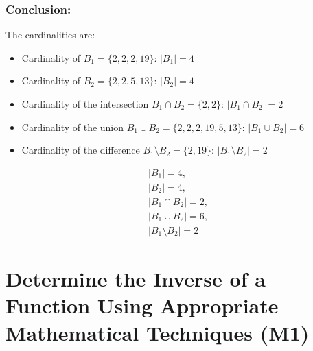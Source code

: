 \documentclass[12pt, a4paper, twoside]{report} %
\begin{document}
\subsubsection*{Conclusion:}
The cardinalities are:
\begin{itemize}
  \item Cardinality of \( B_1 = \{2, 2, 2, 19\} \): \( |B_1| = 4 \)
  \item Cardinality of \( B_2 = \{2, 2, 5, 13\} \): \( |B_2| = 4 \)
  \item Cardinality of the intersection \( B_1 \cap B_2 = \{2, 2\} \): \( |B_1 \cap B_2| = 2 \)
  \item Cardinality of the union \( B_1 \cup B_2 = \{2, 2, 2, 19, 5, 13\} \): \( |B_1 \cup B_2| = 6 \)
  \item Cardinality of the difference \( B_1 \setminus B_2 = \{2, 19\} \): \( |B_1 \setminus B_2| = 2 \)
\end{itemize}
\[
\boxed{
\begin{array}{l}
|B_1| = 4, \\
|B_2| = 4, \\
|B_1 \cap B_2| = 2, \\
|B_1 \cup B_2| = 6, \\
|B_1 \setminus B_2| = 2
\end{array}
}
\]

\section{Determine the Inverse of a Function Using Appropriate Mathematical Techniques (M1)}
\label{sec:M1}


\end{document}
